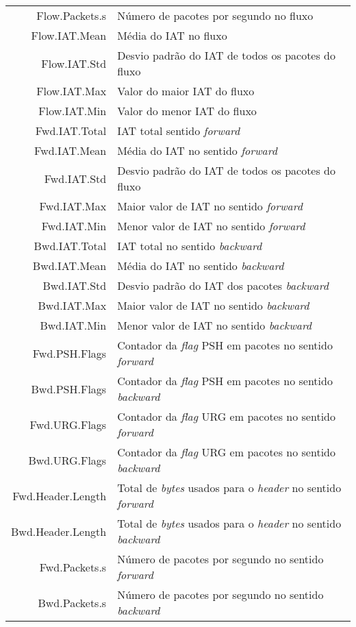 \begin{longtable}{r|p{10.5cm}}
    Flow.Packets.s & Número de pacotes por segundo no fluxo \\
    Flow.IAT.Mean & Média do IAT no fluxo \\
    Flow.IAT.Std & Desvio padrão do IAT de todos os pacotes do fluxo \\
    Flow.IAT.Max & Valor do maior IAT do fluxo \\
    Flow.IAT.Min & Valor do menor IAT do fluxo \\
    Fwd.IAT.Total & IAT total sentido \textit{forward} \\
    Fwd.IAT.Mean & Média do IAT no sentido \textit{forward} \\
    Fwd.IAT.Std & Desvio padrão do IAT de todos os pacotes do fluxo \\
    Fwd.IAT.Max & Maior valor de IAT no sentido \textit{forward} \\
    Fwd.IAT.Min & Menor valor de IAT no sentido \textit{forward} \\
    Bwd.IAT.Total & IAT total no sentido \textit{backward} \\
    Bwd.IAT.Mean & Média do IAT no sentido \textit{backward} \\
    Bwd.IAT.Std & Desvio padrão do IAT dos pacotes \textit{backward} \\
    Bwd.IAT.Max & Maior valor de IAT no sentido \textit{backward} \\
    Bwd.IAT.Min & Menor valor de IAT no sentido \textit{backward} \\
    Fwd.PSH.Flags & Contador da \textit{flag} PSH em pacotes no sentido \textit{forward} \\
    Bwd.PSH.Flags & Contador da \textit{flag} PSH em pacotes no sentido \textit{backward} \\
    Fwd.URG.Flags & Contador da \textit{flag} URG em pacotes no sentido \textit{forward} \\
    Bwd.URG.Flags & Contador da \textit{flag} URG em pacotes no sentido \textit{backward} \\
    Fwd.Header.Length & Total de \textit{bytes} usados para o \textit{header} no sentido \textit{forward} \\
    Bwd.Header.Length & Total de \textit{bytes} usados para o \textit{header} no sentido \textit{backward} \\
    Fwd.Packets.s & Número de pacotes por segundo no sentido \textit{forward} \\
    Bwd.Packets.s & Número de pacotes por segundo no sentido \textit{backward} \\

\end{longtable}
